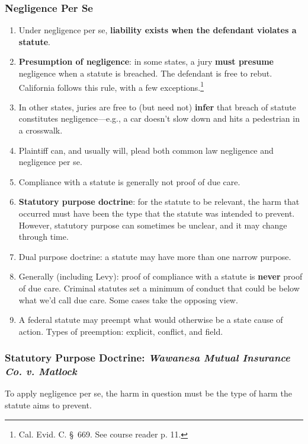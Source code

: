 \subsubsection{Negligence Per Se}
\begin{enumerate}
    \item Under negligence per se, \textbf{liability exists when the defendant 
    violates a statute}.
    \item \textbf{Presumption of negligence}: in some states, a jury 
    \textbf{must presume} negligence when a statute is breached. The defendant 
    is free to rebut. California follows this rule, with a few 
    exceptions.\footnote{Cal. Evid. C. \S\ 669.  See course reader p. 11.} 
    \item In other states, juries are free to (but need not) \textbf{infer} 
    that breach of statute constitutes negligence---e.g., a car doesn't slow 
    down and hits a pedestrian in a crosswalk.
    \item Plaintiff can, and usually will, plead both common law negligence 
    and negligence per se.
    \item Compliance with a statute is generally not proof of due care.
    \item \textbf{Statutory purpose doctrine}: for the statute to be relevant, the 
    harm that occurred must have been the type that the statute was intended 
    to prevent. However, statutory purpose can sometimes be unclear, and it 
    may change through time.
    \item Dual purpose doctrine: a statute may have more than one narrow 
    purpose.
    \item Generally (including Levy): proof of compliance with a statute is 
    \textbf{never} proof of due care. Criminal statutes set a minimum of 
    conduct that could be below what we'd call due care. Some cases take the 
    opposing view.
    \item A federal statute may preempt what would otherwise be a state cause 
    of action. Types of preemption: explicit, conflict, and field.
\end{enumerate}

\subsubsection{Statutory Purpose Doctrine: \emph{Wawanesa Mutual Insurance Co. v. Matlock}}

To apply negligence per se, the harm in question must be the type of harm the 
statute aims to prevent.


